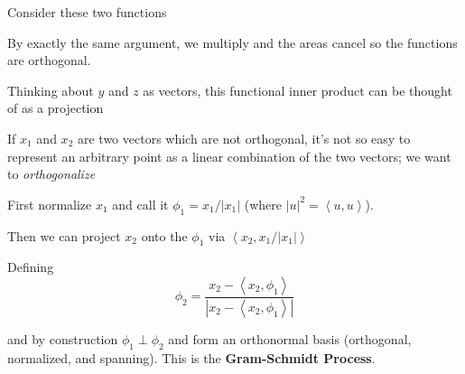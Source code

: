 \documentclass[12pt]{report}
\newcommand{\brak}[1]{\left\langle #1 \right\rangle}
\newcommand{\abs}[1]{\left\vert #1 \right\vert}
\newcommand*{\tbf}[1]{\ifmmode\mathbf{#1}\else\textbf{#1}\fi}
\begin{document}
Consider these two functions 
\begin{center}
    
    \hspace{1cm}
\end{center}

By exactly the same argument, we multiply and the areas cancel so the functions are orthogonal.

Thinking about $y$ and $z$ as vectors, this functional inner product can be thought of as a projection 

If $x_1$ and $x_2$ are two vectors which are not orthogonal, it's not so easy to represent an arbitrary point as a linear combination of the two vectors; we want to \emph{orthogonalize} 

First normalize $x_1$ and call it $\phi_1 = x_1/\abs{x_1}$ 
(where $\abs u^2 = \brak{u, u}$). 

Then we can project $x_2$ onto the $\phi_1$ via $\brak{x_2, x_1/\abs{x_1}}$

Defining 
\[\phi_2 = \frac{x_2 - \brak{ x_2, \phi_1}}{\abs{x_2 - \brak{x_2, \phi_1}}}\]

and by construction $\phi_1 \perp \phi_2$ and form an orthonormal basis (orthogonal, normalized, and spanning). This is the \tbf{Gram-Schmidt Process}. 
\end{document}
